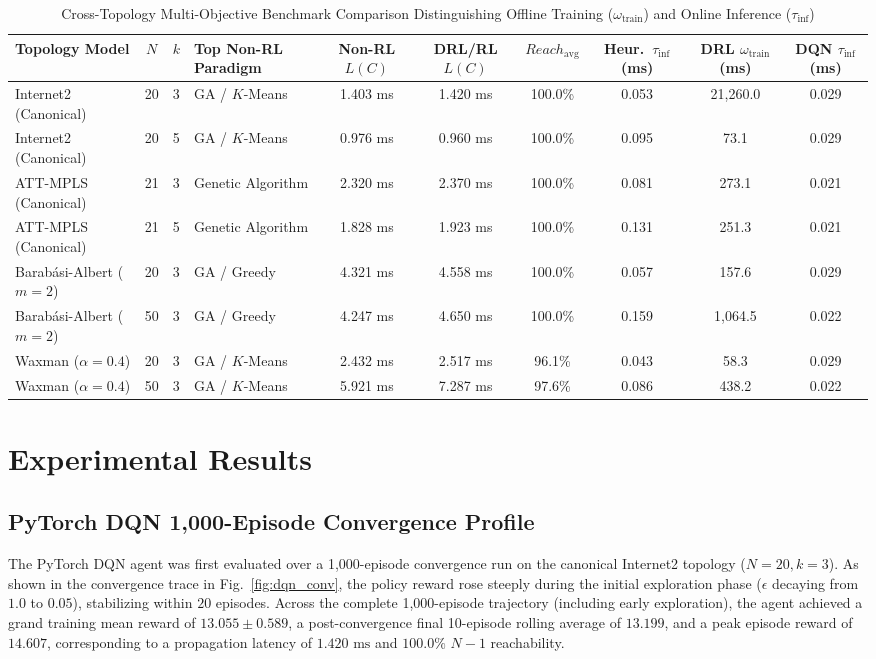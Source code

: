 \documentclass[conference]{IEEEtran}
\begin{document}
\begin{table}[t]
\caption{Cross-Topology Multi-Objective Benchmark Comparison Distinguishing Offline Training ($\omega_{\text{train}}$) and Online Inference ($\tau_{\text{inf}}$)}
\label{tab:factorial}
\centering
\scriptsize
\setlength{\tabcolsep}{4.0pt}
\begin{tabular}{lcclcccccc}
\toprule
\textbf{Topology Model} & \textbf{$N$} & \textbf{$k$} & \textbf{Top Non-RL Paradigm} & \textbf{Non-RL $L(C)$} & \textbf{DRL/RL $L(C)$} & \textbf{$Reach_{\text{avg}}$} & \textbf{Heur.\ $\tau_{\text{inf}}$ (ms)} & \textbf{DRL $\omega_{\text{train}}$ (ms)} & \textbf{DQN $\tau_{\text{inf}}$ (ms)} \\
\midrule
Internet2 (Canonical) & 20 & 3 & GA / $K$-Means & 1.403 ms & 1.420 ms & 100.0\% & 0.053 & 21,260.0 & 0.029 \\
Internet2 (Canonical) & 20 & 5 & GA / $K$-Means & 0.976 ms & 0.960 ms & 100.0\% & 0.095 & 73.1 & 0.029 \\
ATT-MPLS (Canonical) & 21 & 3 & Genetic Algorithm & 2.320 ms & 2.370 ms & 100.0\% & 0.081 & 273.1 & 0.021 \\
ATT-MPLS (Canonical) & 21 & 5 & Genetic Algorithm & 1.828 ms & 1.923 ms & 100.0\% & 0.131 & 251.3 & 0.021 \\
Barab\'{a}si-Albert ($m=2$) & 20 & 3 & GA / Greedy & 4.321 ms & 4.558 ms & 100.0\% & 0.057 & 157.6 & 0.029 \\
Barab\'{a}si-Albert ($m=2$) & 50 & 3 & GA / Greedy & 4.247 ms & 4.650 ms & 100.0\% & 0.159 & 1,064.5 & 0.022 \\
Waxman ($\alpha=0.4$) & 20 & 3 & GA / $K$-Means & 2.432 ms & 2.517 ms & 96.1\% & 0.043 & 58.3 & 0.029 \\
Waxman ($\alpha=0.4$) & 50 & 3 & GA / $K$-Means & 5.921 ms & 7.287 ms & 97.6\% & 0.086 & 438.2 & 0.022 \\
\bottomrule
\end{tabular}
\vspace{-6pt}
\end{table}

\section{Experimental Results}

\subsection{PyTorch DQN 1,000-Episode Convergence Profile}
The PyTorch DQN agent was first evaluated over a 1,000-episode convergence run on the canonical Internet2 topology ($N = 20, k = 3$). As shown in the convergence trace in Fig.~\ref{fig:dqn_conv}, the policy reward rose steeply during the initial exploration phase ($\epsilon$ decaying from $1.0$ to $0.05$), stabilizing within $20$ episodes. Across the complete 1,000-episode trajectory (including early exploration), the agent achieved a grand training mean reward of $13.055 \pm 0.589$, a post-convergence final 10-episode rolling average of $13.199$, and a peak episode reward of $14.607$, corresponding to a propagation latency of $1.420\text{ ms}$ and $100.0\%$ $N-1$ reachability.
\end{document}

